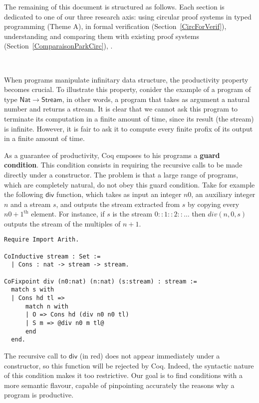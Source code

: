 \documentclass[11pt,twocolumn]{article}
\begin{document}
The remaining of this document is structured as follows.
Each section is dedicated to one of our three research axis: using circular proof systems in typed programming (Theme A), in formal verification (Section~\ref{CircForVerif}), understanding and comparing them with existing proof systems (Section~\ref{ComparaisonParkCirc}), .


\medskip{}~\label{CircForProg}

When programs manipulate infinitary data structure, the productivity property becomes crucial. To illustrate this property, conider the example of a program of type $\mathsf{Nat}\rightarrow \mathsf{Stream}$, in other words, a program that takes as argument a natural number and returns a stream. It is clear that we cannot ask this program to terminate its computation in a finite amount of time, since its result (the stream) is infinite. However,
it is fair to ask it to compute every finite profix of its output in a finite amount of time.



As a guarantee of productivity, Coq emposes to his programs a \textbf{guard condition}.
This condition consists in requiring the recursive calls to be made directly under a constructor. The problem is that a large range of programs, which are completely natural, do not obey this guard condition. Take for example the following $\mathsf{div}$ function, which takes as input an integer $n0$, an auxiliary integer $n$ and a stream $s$, and outputs the stream extracted from $s$ by copying every $n0+1^{\text{th}}$ element. For instance, if $s$ is the stream
  $0::1::2::\dots$ then $div(n,0,s)$ outputs the stream of the multiples of $n+1$.
\begin{lstlisting}[style=base]
Require Import Arith.

CoInductive stream : Set :=
  | Cons : nat -> stream -> stream.

CoFixpoint div (n0:nat) (n:nat) (s:stream) : stream :=
  match s with
  | Cons hd tl =>
      match n with
      | O => Cons hd (div n0 n0 tl)
      | S m => @div n0 m tl@
      end
  end.
\end{lstlisting}
The recursive call to $\mathsf{div}$ (in red) does not appear immediately under a constructor, so this function will be rejected by Coq.
  Indeed, the syntactic nature of this condition makes it too restrictive.
Our goal is to find conditions with a more semantic flavour, capable of pinpointing accurately the reasons why a program is productive.
\end{document}
